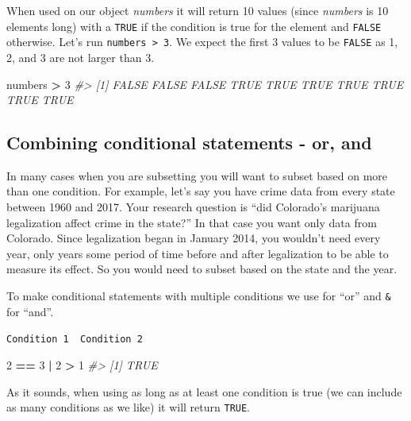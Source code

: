 \documentclass[
  12pt,
]{book}
\newenvironment{Shaded}{\begin{snugshade}}{\end{snugshade}}
\newcommand{\CommentTok}[1]{\textcolor[rgb]{0.56,0.35,0.01}{\textit{#1}}}
\newcommand{\DecValTok}[1]{\textcolor[rgb]{0.00,0.00,0.81}{#1}}
\newcommand{\NormalTok}[1]{#1}
\newcommand{\OperatorTok}[1]{\textcolor[rgb]{0.81,0.36,0.00}{\textbf{#1}}}
\newcommand{\StringTok}[1]{\textcolor[rgb]{0.31,0.60,0.02}{#1}}
\begin{document}
When used on our object \emph{numbers} it will return 10 values (since \emph{numbers} is 10 elements long) with a \texttt{TRUE} if the condition is true for the element and \texttt{FALSE} otherwise. Let's run \texttt{numbers\ \textgreater{}\ 3}. We expect the first 3 values to be \texttt{FALSE} as 1, 2, and 3 are not larger than 3.

\begin{Shaded}
\begin{Highlighting}[]
\NormalTok{numbers }\OperatorTok{>}\StringTok{ }\DecValTok{3}
\CommentTok{\#>  [1] FALSE FALSE FALSE  TRUE  TRUE  TRUE  TRUE  TRUE  TRUE  TRUE}
\end{Highlighting}
\end{Shaded}

\hypertarget{combining-conditional-statements---or-and}{%
\subsection{Combining conditional statements - or, and}\label{combining-conditional-statements---or-and}}

In many cases when you are subsetting you will want to subset based on more than one condition. For example, let's say you have crime data from every state between 1960 and 2017. Your research question is ``did Colorado's marijuana legalization affect crime in the state?'' In that case you want only data from Colorado. Since legalization began in January 2014, you wouldn't need every year, only years some period of time before and after legalization to be able to measure its effect. So you would need to subset based on the state and the year.

To make conditional statements with multiple conditions we use \texttt{\textbar{}} for ``or'' and \texttt{\&} for ``and''.

\texttt{Condition\ 1\ \textbar{}\ Condition\ 2}

\begin{Shaded}
\begin{Highlighting}[]
\DecValTok{2} \OperatorTok{==}\StringTok{ }\DecValTok{3} \OperatorTok{|}\StringTok{ }\DecValTok{2} \OperatorTok{>}\StringTok{ }\DecValTok{1}
\CommentTok{\#> [1] TRUE}
\end{Highlighting}
\end{Shaded}

As it sounds, when using \texttt{\textbar{}} as long as at least one condition is true (we can include as many conditions as we like) it will return \texttt{TRUE}.
\end{document}
